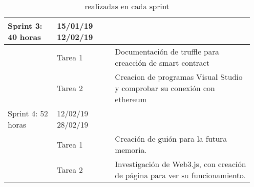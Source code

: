 \begin{table}[H]
\begin{tabular}{|p{1.5cm}|p{1.5cm}|p{5cm}}
Sprint 3: 40 horas       & 15/01/19 12/02/19           & \multicolumn{1}{p{9.2cm}|}{}                                                                                             \\ \hline
                         & Tarea 1                       & \multicolumn{1}{p{9.2cm}|}{Documentación de truffle para creacción de smart contract}                           \\ \hline
                         & Tarea 2                       & \multicolumn{1}{p{9.2cm}|}{Creacion de programas Visual Studio y comprobar su conexión con ethereum}            \\ \hline
Sprint 4: 52 horas       & 12/02/19 28/02/19           & \multicolumn{1}{l|}{}                                                                                             \\ \hline
                         & Tarea 1                       & \multicolumn{1}{p{9.2cm}|}{Creación de guión para la futura memoria.}                                                    \\ \hline
                         & Tarea 2                       & \multicolumn{1}{p{9.2cm}|}{Investigación de Web3.js, con creación de página para ver su funcionamiento.}                 \\ \hline
                         
              \end{tabular}
              \caption{realizadas en cada sprint}
\label{tabla:sprint0}
\end{table}       
         
